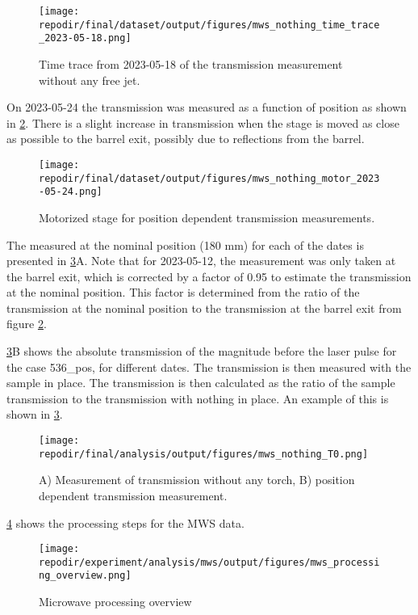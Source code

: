 \begin{figure}[]
\centering
\texttt{[image: \\repodir/final/dataset/output/figures/mws\_nothing\_time\_trace\_2023-05-18.png]}
\caption{Time trace from 2023-05-18 of the transmission measurement without any free jet.}
\label{fig:SI_MWS_nothing_time_trace}
\end{figure}

On 2023-05-24 the transmission was measured as a function of position as shown in \ref{fig:SI_MWS_nothing_motor}. There is a slight increase in transmission when the stage is moved as close as possible to the barrel exit, possibly due to reflections from the barrel.


\begin{figure}
\centering
\texttt{[image: \\repodir/final/dataset/output/figures/mws\_nothing\_motor\_2023-05-24.png]}
\caption{Motorized stage for position dependent transmission measurements.}
\label{fig:SI_MWS_nothing_motor}
\end{figure}


The  measured at the nominal position (180 mm) for each of the dates is presented in \ref{fig:SI_MWS_nothing_T0}A. Note that for 2023-05-12, the measurement was only taken at the barrel exit, which is corrected by a factor of 0.95 to estimate the transmission at the nominal position. This factor is determined from the ratio of the transmission at the nominal position to the transmission at the barrel exit from figure \ref{fig:SI_MWS_nothing_motor}.

\ref{fig:SI_MWS_nothing_T0}B shows the absolute transmission of the magnitude before the laser pulse for the case 536\_pos, for different dates. The transmission is then measured with the sample in place. The transmission is then calculated as the ratio of the sample transmission to the transmission with nothing in place. An example of this is shown in \ref{fig:SI_MWS_nothing_T0}.  




\begin{figure}[]
\centering
\texttt{[image: \\repodir/final/analysis/output/figures/mws\_nothing\_T0.png]}
\caption{A) Measurement of transmission without any torch, B) position dependent transmission measurement.}
\label{fig:SI_MWS_nothing_T0}
\end{figure}


\ref{fig:SI_mws_processing_overview} shows the processing steps for the MWS data. 

\begin{figure}[]
\centering
\texttt{[image: \\repodir/experiment/analysis/mws/output/figures/mws\_processing\_overview.png]}
\caption{Microwave processing overview}
\label{fig:SI_mws_processing_overview}
\end{figure}


